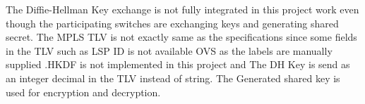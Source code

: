The Diffie-Hellman Key exchange is not fully integrated in this project work even though the participating switches are exchanging keys and generating shared secret. The MPLS TLV is not exactly same as the specifications since some fields in the TLV such as LSP ID is not available OVS as the labels are manually supplied .HKDF is not implemented in this project and The DH Key is send as an integer decimal in the TLV instead of string. The Generated shared key is used for encryption and decryption.  



